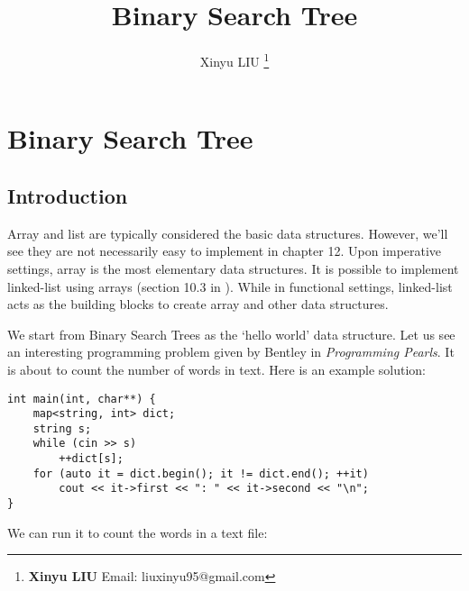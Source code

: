 \documentclass[b5paper]{article}
\begin{document}
\title{Binary Search Tree}

\author{Xinyu LIU
\thanks{{\bfseries Xinyu LIU} \newline
  Email: liuxinyu95@gmail.com \newline}
  }

\maketitle
\fi


\ifx\wholebook\relax
\chapter{Binary Search Tree}
\fi

\section{Introduction}
\label{introduction} 

Array and list are typically considered the basic data structures. However, we'll see they are not necessarily easy to implement in chapter 12. Upon imperative settings, array is the most elementary data structures. It is possible to implement linked-list using arrays (section  10.3 in \cite{CLRS}). While in functional settings, linked-list acts as the building blocks to create array and other data structures.

We start from Binary Search Trees as the `hello world' data structure. Let us see an interesting programming problem given by Bentley in {\em Programming Pearls}\cite{Bentley}. It is about to count the number of words in text. Here is an example solution:

\lstset{language=C++, frame=single}
\begin{lstlisting}
int main(int, char**) {
    map<string, int> dict;
    string s;
    while (cin >> s)
        ++dict[s];
    for (auto it = dict.begin(); it != dict.end(); ++it)
        cout << it->first << ": " << it->second << "\n";
}
\end{lstlisting}

We can run it to count the words in a text file:
\end{document}

